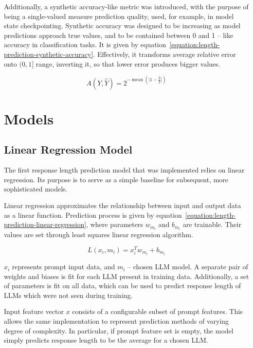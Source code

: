 \documentclass[a4paper,11pt,twoside]{report}
\theoremstyle{definition}
\begin{document}
Additionally, a synthetic accuracy-like metric was introduced, with the purpose of being a single-valued measure prediction quality, used, for example, in model state checkpointing. Synthetic accuracy was designed to be increasing as model predictions approach true values, and to be contained between 0 and 1 -- like accuracy in classification tasks. It is given by equation~\ref{equation:length-prediction-synthetic-accuracy}. Effectively, it transforms average relative error onto $(0, 1]$ range, inverting it, so that lower error produces bigger values.

\begin{equation}
\label{equation:length-prediction-synthetic-accuracy}
    A(Y, \hat{Y}) = 2^{-\operatorname{mean}(\vert 1 - \frac{\hat{y}}{y} \vert)}
\end{equation}

\section{Models}
\label{section:length-prediction-models}

\subsection{Linear Regression Model}

The first response length prediction model that was implemented relies on linear regression. Its purpose is to serve as a simple baseline for subsequent, more sophisticated models.

Linear regression approximates the relationship between input and output data as a linear function. Prediction process is given by equation~\ref{equation:length-prediction-linear-regression}, where parameters $w_{m_i}$ and $b_{m_i}$ are trainable. Their values are set through least squares linear regression algorithm.

\begin{equation}
\label{equation:length-prediction-linear-regression}
    L(x_i, m_i) = x_i^T w_{m_i} + b_{m_i} 
\end{equation}

$x_i$ represents prompt input data, and $m_i$ -- chosen LLM model. A separate pair of weights and biases is fit for each LLM present in training data. Additionally, a set of parameters is fit on all data, which can be used to predict response length of LLMs which were not seen during training.

Input feature vector $x$ consists of a configurable subset of prompt features. This allows the same implementation to represent prediction methods of varying degree of complexity. In particular, if prompt feature set is empty, the model simply predicts response length to be the average for a chosen LLM.
\end{document}
